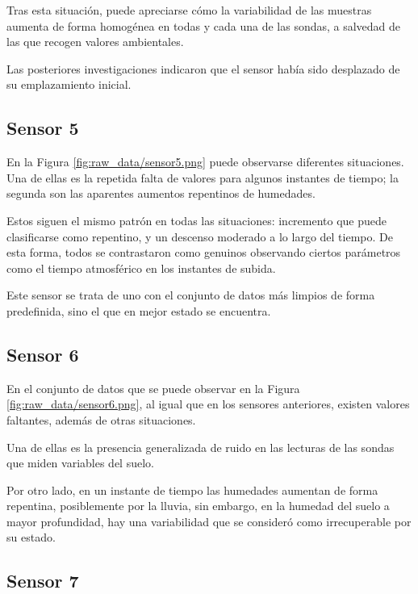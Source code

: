 Tras esta situación, puede apreciarse cómo la variabilidad de las muestras
aumenta de forma homogénea en todas y cada una de las sondas, a salvedad de las que recogen
valores ambientales.

Las posteriores investigaciones indicaron que el sensor había sido desplazado
de su emplazamiento inicial.

\newpage
\subsection{Sensor 5}


En la Figura \ref{fig:raw_data/sensor5.png} puede observarse diferentes situaciones.
Una de ellas es la repetida falta de valores para algunos instantes de tiempo; la 
segunda son las aparentes aumentos repentinos de humedades.

Estos siguen el mismo patrón en todas las situaciones: incremento que puede clasificarse
como repentino, y un descenso moderado a lo largo del tiempo.
De esta forma, todos se contrastaron como genuinos observando ciertos parámetros como
el tiempo atmosférico en los instantes de subida.

Este sensor se trata de uno con el conjunto de datos más limpios de forma predefinida, 
sino el que en mejor estado se encuentra.

\newpage
\subsection{Sensor 6}


En el conjunto de datos que se puede observar en la Figura \ref{fig:raw_data/sensor6.png},
al igual que en los sensores anteriores, existen valores faltantes, además de 
otras situaciones.

Una de ellas es la presencia generalizada de ruido en las lecturas
de las sondas que miden variables del suelo.

Por otro lado, en un instante de tiempo las humedades aumentan de forma repentina, posiblemente
por la lluvia, sin embargo, en la humedad del suelo a mayor profundidad, hay una variabilidad
que se consideró como irrecuperable por su estado.

\newpage
\subsection{Sensor 7}

